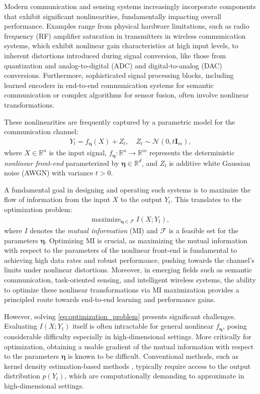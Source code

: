 \documentclass[conference]{IEEEtran}
\newcommand{\R}{\mathbb{R}}
\newcommand{\Yt}{Y_t}
\begin{document}
Modern communication and sensing systems increasingly incorporate components 
that exhibit significant nonlinearities, fundamentally impacting overall performance. 
Examples range from physical hardware limitations, such as radio frequency (RF) amplifier saturation 
in transmitters in wireless communication systems, 
which exhibit nonlinear gain characteristics at high input levels, 
to inherent distortions introduced during signal conversion, 
like those from quantization and analog-to-digital (ADC) and digital-to-analog (DAC) conversions. 
Furthermore, sophisticated signal processing blocks, 
including learned encoders in end-to-end communication systems for semantic communication 
or complex algorithms for sensor fusion, often involve nonlinear transformations.



These nonlinearities are frequently captured by a parametric model for the communication channel:
\begin{align}
Y_t = f_{\bm \eta}(X) + Z_t, \quad Z_t \sim \mathcal{N}(0, t \bm I_m), \label{eq:channel_model}
\end{align}
where $X \in \R^n$ is the input signal, $f_{\bm \eta}: \R^n \to \R^m$ represents 
the deterministic {\em nonlinear front-end} parameterized by 
$\bm \eta \in \R^d$, and $Z_t$ is additive white Gaussian noise (AWGN) with variance $t > 0$.

A fundamental goal in designing and operating such systems is to maximize 
the flow of information from the input $X$ to the output $Y_t$. 
This translates to the optimization problem:
\begin{align}
\label{eq:optimization_problem}
\text{maximize}_{\bm \eta \in \mathcal{F}}\ I(X; Y_t),
\end{align}
where $I$ denotes the {\em mutual information} (MI) and $\mathcal{F}$ 
is a feasible set for the parameters $\bm \eta$. 
Optimizing MI is crucial, as maximizing the mutual information 
with respect to the parameters of the nonlinear front-end 
is fundamental to achieving high data rates and robust performance, 
pushing towards the channel's limits under nonlinear distortions. 
Moreover, in emerging fields such as semantic communication, 
task-oriented sensing, and intelligent wireless systems, 
the ability to optimize these nonlinear transformations via MI maximization 
provides a principled route towards end-to-end learning and performance gains.

However, solving \eqref{eq:optimization_problem} presents significant challenges. 
Evaluating $I(X; \Yt)$ itself is often intractable for general nonlinear $f_{\bm \eta}$, 
posing considerable difficulty especially in high-dimensional settings.
More critically for optimization, 
obtaining a usable gradient of the mutual information with respect 
to the parameters $\bm \eta$ is known to be difficult. 
Conventional methods, such as kernel density estimation-based methods \cite{moon1995}, 
typically require access to the output distribution $p(Y_t)$, 
which are computationally demanding to approximate in high-dimensional settings.
\end{document}
